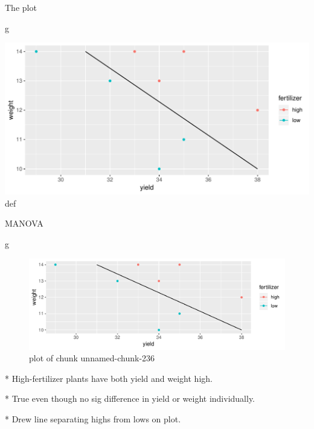 \documentclass[ignorenonframetext,]{beamer}
\newenvironment{Shaded}{\begin{snugshade}}{\end{snugshade}}
\newcommand{\NormalTok}[1]{#1}
\begin{document}
\begin{frame}[fragile]{The plot}
\protect\hypertarget{the-plot-7}{}

\begin{Shaded}
\begin{Highlighting}[]
\NormalTok{g}
\end{Highlighting}
\end{Shaded}

\includegraphics{figure/charlecombe-1.pdf} def

\end{frame}

\begin{frame}[fragile]{MANOVA}
\protect\hypertarget{manova}{}

\begin{Shaded}
\begin{Highlighting}[]
\NormalTok{g}
\end{Highlighting}
\end{Shaded}

\begin{figure}
\centering
\includegraphics{figure/unnamed-chunk-236-1.pdf}
\caption{plot of chunk unnamed-chunk-236}
\end{figure}

\begin{small}


* High-fertilizer plants have both yield and weight high.

* True even though no sig difference in yield or weight individually.

* Drew line separating highs from lows on plot.

\end{small}

\end{frame}
\end{document}
